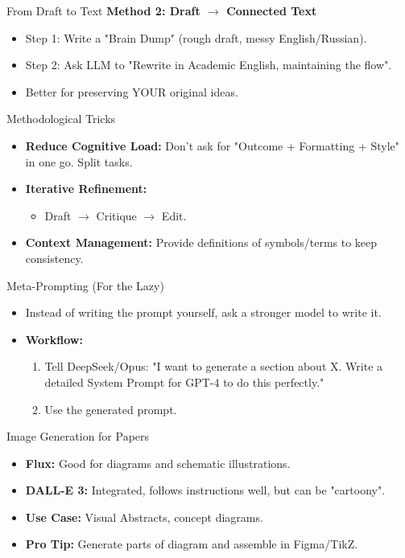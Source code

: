 \documentclass[aspectratio=169]{beamer}
\begin{document}
\begin{frame}[t]{From Draft to Text}
    \textbf{Method 2: Draft $\to$ Connected Text}
    \begin{itemize}
        \item Step 1: Write a "Brain Dump" (rough draft, messy English/Russian).
        \item Step 2: Ask LLM to "Rewrite in Academic English, maintaining the flow".
        \item Better for preserving YOUR original ideas.
    \end{itemize}
\end{frame}

\begin{frame}[t]{Methodological Tricks}
    \begin{itemize}
        \item \textbf{Reduce Cognitive Load:} Don't ask for "Outcome + Formatting + Style" in one go. Split tasks.
        \item \textbf{Iterative Refinement:} 
        \begin{itemize}
            \item Draft $\to$ Critique $\to$ Edit.
        \end{itemize}
        \item \textbf{Context Management:} Provide definitions of symbols/terms to keep consistency.
    \end{itemize}
\end{frame}

\begin{frame}[t]{Meta-Prompting (For the Lazy)}
    \begin{itemize}
        \item Instead of writing the prompt yourself, ask a stronger model to write it.
        \item \textbf{Workflow:}
        \begin{enumerate}
            \item Tell DeepSeek/Opus: "I want to generate a section about X. Write a detailed System Prompt for GPT-4 to do this perfectly."
            \item Use the generated prompt.
        \end{enumerate}
    \end{itemize}
\end{frame}

\begin{frame}[t]{Image Generation for Papers}
    \begin{itemize}
        \item \textbf{Flux:} Good for diagrams and schematic illustrations.
        \item \textbf{DALL-E 3:} Integrated, follows instructions well, but can be "cartoony".
        \item \textbf{Use Case:} Visual Abstracts, concept diagrams.
        \item \textbf{Pro Tip:} Generate parts of diagram and assemble in Figma/TikZ.
    \end{itemize}
\end{frame}
\end{document}
